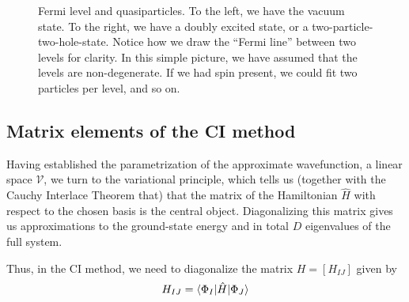 \documentclass{report}
\theoremstyle{plain}
\theoremstyle{definition}
\begin{document}
\begin{figure}
\begin{center}
  \end{center}
  \caption{Fermi level and quasiparticles\label{fig:fermi}. To the
    left, we have the vacuum state. To the right, we have a doubly
    excited state, or a two-particle-two-hole-state. Notice how we
    draw the ``Fermi line'' between two levels for clarity. In this
    simple picture, we have assumed that the levels are
    non-degenerate. If we had spin present, we could fit two particles
    per level, and so on.}
\end{figure}


\subsection{Matrix elements of the CI method}
\label{sec:ci-mat-elem}




Having established the parametrization of the approximate
wavefunction, a linear space $\mathcal{V}$, we turn to the variational principle,
which tells us (together with the Cauchy Interlace Theorem that) that
the matrix of the Hamiltonian $\hat{H}$ with respect to the chosen
basis is the central object. Diagonalizing this matrix gives us
approximations to the ground-state energy and in total $D$ eigenvalues
of the full system.

Thus, in the CI method, we need to diagonalize the matrix $H = [H_{IJ}]$
given by
\begin{equation}
  H_{IJ} = \braket{\Phi_I|\hat{H}|\Phi_J}
\end{equation}
%
\end{document}

